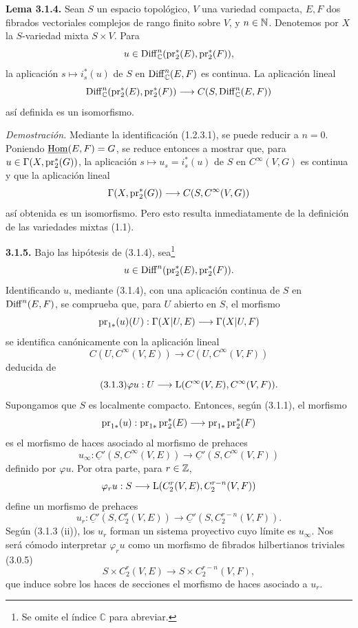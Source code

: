 \providecommand{\sisi}[2]{#2}

\textbf{Lema 3.1.4.} Sean $S$ un espacio topológico, $V$ una variedad compacta, $E,F$ dos fibrados vectoriales complejos de rango finito sobre $V$, y $n\in\mathbb N$. Denotemos por $X$ la $S$-variedad mixta $S\times V$. Para
\[
 u\in\operatorname{Diff}^n_\mathbb C(\operatorname{pr}_2^*(E),\operatorname{pr}_2^*(F)),
\]
la aplicación $s\mapsto i_s^*(u)$ de $S$ en $\operatorname{Diff}^n_\mathbb C(E,F)$ es continua. La aplicación lineal
\[
 \operatorname{Diff}^n_\mathbb C(\operatorname{pr}_2^*(E),\operatorname{pr}_2^*(F))
 \longrightarrow C(S,\operatorname{Diff}^n_\mathbb C(E,F))
\]
así definida es un isomorfismo.

\emph{Demostración.} Mediante la identificación (1.2.3.1), se puede reducir a $n=0$. Poniendo $\underline{\operatorname{Hom}}(E,F)=G$, se reduce entonces a mostrar que, para $u\in\Gamma(X,\operatorname{pr}_2^*(G))$, la aplicación $s\mapsto u_s=i_s^*(u)$ de $S$ en $C^\infty(V,G)$ es continua y que la aplicación lineal
\[
 \Gamma(X,\operatorname{pr}_2^*(G))\longrightarrow C(S,C^\infty(V,G))
\]
así obtenida es un isomorfismo. Pero esto resulta inmediatamente de la definición de las variedades mixtas (1.1).

\textbf{3.1.5.} Bajo las hipótesis de (3.1.4), sea\footnote{Se omite el índice $\mathbb C$ para abreviar.}
\[
 u\in\operatorname{Diff}^n(\operatorname{pr}_2^*(E),\operatorname{pr}_2^*(F)).
\]
Identificando $u$, mediante (3.1.4), con una aplicación continua de $S$ en $\operatorname{Diff}^n(E,F)$, se comprueba que, para $U$ abierto en $S$, el morfismo
\[
 \operatorname{pr}_{1*}(u)(U):\Gamma(X|U,E)\longrightarrow \Gamma(X|U,F)
\]
se identifica canónicamente con la aplicación lineal
\[
 C(U,C^\infty(V,E))\longrightarrow C(U,C^\infty(V,F))
\]
deducida de
\begin{equation}\tag{3.1.3}
 \varphi u:U\longrightarrow \operatorname{L}(C^\infty(V,E),C^\infty(V,F)).
\end{equation}
Supongamos que $S$ es localmente compacto. Entonces, según (3.1.1), el morfismo
\[
 \operatorname{pr}_{1*}(u):\operatorname{pr}_{1*}\operatorname{pr}_2^*(E)
 \longrightarrow \operatorname{pr}_{1*}\operatorname{pr}_2^*(F)
\]
es el morfismo de haces asociado al morfismo de prehaces
\[
 u_\infty:\underline C'(S,C^\infty(V,E))
 \longrightarrow \underline C'(S,C^\infty(V,F))
\]
definido por $\varphi u$. Por otra parte, para $r\in\mathbb Z$,
\[
 \varphi_r u:S\longrightarrow \operatorname{L}(C^r_2(V,E),C^{r-n}_2(V,F))
\]
define un morfismo de prehaces
\[
 u_r:\underline C'(S,C^r_2(V,E))
 \longrightarrow \underline C'(S,\sisi{C^r_2(V,F)}{C^{r-n}_2(V,F)}).
\]
Según (3.1.3 (ii)), los $u_r$ forman un sistema proyectivo cuyo límite es $u_\infty$. Nos será cómodo interpretar $\varphi_r u$ como un morfismo de fibrados hilbertianos triviales (3.0.5)
\[
 S\times C^r_2(V,E)\longrightarrow S\times C^{r-n}_2(V,F),
\]
que induce sobre los haces de secciones el morfismo de haces asociado a $u_r$.

